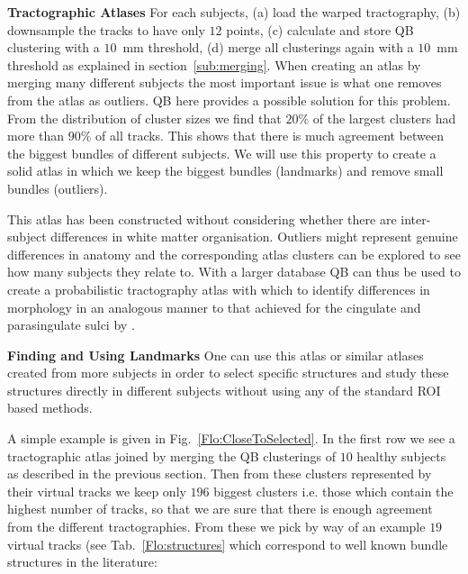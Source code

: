 \documentclass{bioinfo}
\begin{document}

\textbf{Tractographic Atlases} For each subjects, (a) load the warped
tractography, (b) downsample the tracks to have only $12$ points, (c) calculate
and store QB clustering with a $10$~mm threshold, (d) merge all
clusterings again with a $10$~mm threshold as explained in
section~\ref{sub:merging}. When creating an atlas by merging
many different subjects the most important issue is what one removes
from the atlas as outliers.  QB here provides a possible solution for
this problem. From the distribution of cluster sizes we find that $20\%$
of the largest clusters had more than $90\%$ of all tracks. This shows
that there is much agreement between the biggest bundles of different
subjects.  We will use this property to create a solid atlas in which we
keep the biggest bundles (landmarks) and remove small bundles
(outliers).

This atlas has been constructed without considering whether there are
inter-subject differences in white matter organisation. Outliers might
represent genuine differences in anatomy and the corresponding atlas
clusters can be explored to see how many subjects they relate to. With a
larger database QB can thus be used to create a probabilistic
tractography atlas with which to identify differences in morphology in
an analogous manner to that achieved for the cingulate and parasingulate
sulci by \cite{paus1996human}.

\textbf{Finding and Using Landmarks} One can use this atlas or similar
atlases created from more subjects in order to select specific
structures and study these structures directly in different subjects
without using any of the standard ROI based methods.

A simple example is given in Fig.~\ref{Flo:CloseToSelected}. In the
first row we see a tractographic atlas joined by merging the QB
clusterings of $10$ healthy subjects as described in the previous
section. Then from these clusters represented by their virtual tracks we
keep only $196$ biggest clusters i.e. those which contain the highest
number of tracks, so that we are sure that there is enough agreement
from the different tractographies. From these we pick by way of an
example $19$ virtual tracks (see Tab.~\ref{Flo:structures} which
correspond to well known bundle structures in the literature:
\end{document}
